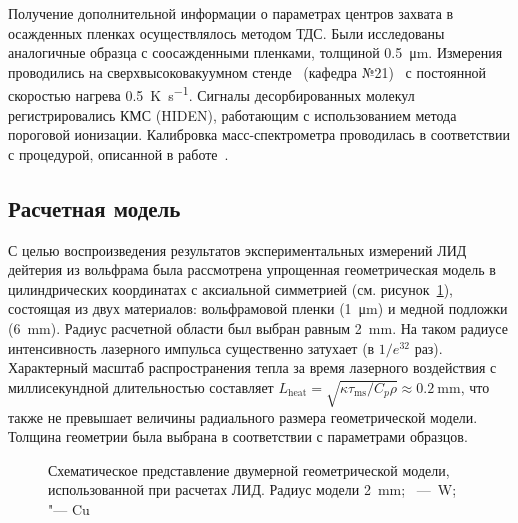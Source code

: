 Получение дополнительной информации о параметрах центров захвата в осажденных пленках осуществлялось методом ТДС. Были исследованы аналогичные образца с соосажденными пленками, толщиной \SI{0.5}{\micro\metre}. Измерения проводились на сверхвысоковакуумном стенде \thesisOrganizationShort \ (кафедра №21)~\cite{Rusinov2009} с постоянной скоростью нагрева \SI{0.5}{\kelvin\per\second}. Сигналы десорбированных молекул регистрировались КМС (HIDEN), работающим с использованием метода пороговой ионизации. Калибровка масс-спектрометра проводилась в соответствии с процедурой, описанной в работе~\cite{Rusinov2009}.

\subsection{Расчетная модель}\label{subsec:ch4/sec1/subsec3}

С целью воспроизведения результатов экспериментальных измерений ЛИД дейтерия из вольфрама была рассмотрена упрощенная геометрическая модель в цилиндрических координатах с аксиальной симметрией (см. рисунок~\cref{fig:ch4/LID_geom}), состоящая из двух материалов: вольфрамовой пленки (\SI{1}{\micro\meter}) и медной подложки (\SI{6}{\milli\meter}). Радиус расчетной области был выбран равным \SI{2}{\milli\meter}. На таком радиусе интенсивность лазерного импульса существенно затухает (в \( 1/e^{32} \) раз). Характерный масштаб распространения тепла за время лазерного воздействия с миллисекундной длительностью составляет \( L_\mathrm{heat}=\sqrt{\kappa \tau_\mathrm{ms}/C_p \rho} \approx \SI{0.2}{\milli\meter} \), что также не превышает величины радиального размера геометрической модели. Толщина геометрии была выбрана в соответствии с параметрами образцов.

\begin{figure}[ht]
    \caption{Схематическое представление двумерной геометрической модели, использованной при расчетах ЛИД. Радиус модели \SI{2}{\milli\meter}; \cruleme[customgrey]{0.5cm}{0.5cm}~---~W; \cruleme[customorange]{0.5cm}{0.5cm} "--- Cu}\label{fig:ch4/LID_geom}
\end{figure}

